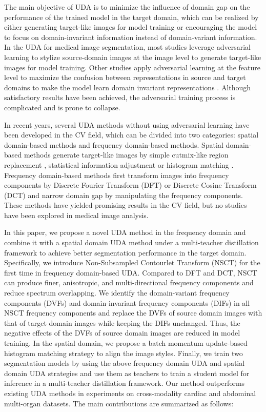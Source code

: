 \documentclass[letterpaper]{article} %
\begin{document}
The main objective of UDA is to minimize the influence of domain gap on the performance of the trained model in the target domain, 
which can be realized by either generating target-like images for model training or encouraging the model to focus on domain-invariant 
information instead of domain-variant information. In the UDA for medical image segmentation, most studies leverage adversarial learning 
to stylize source-domain images at the image level \cite{1,2,13,14,16,17,18,41} to generate target-like images for model training. Other studies 
apply adversarial learning at the feature level to maximize the confusion between representations in source and target domains to 
make the model learn domain invariant representations \cite{20,21}. Although satisfactory results have been achieved, the adversarial training 
process  is complicated and is prone to collapse.

In recent years, several UDA methods without using adversarial learning have been developed in the CV field, which can be 
divided into two categories: spatial domain-based methods and frequency domain-based methods. Spatial domain-based methods generate target-like images 
by simple cutmix-like region replacement \cite{22}, statistical information adjustment \cite{23,24} 
or histogram matching \cite{26}. Frequency domain-based methods first 
transform images into frequency components by Discrete Fourier Transform (DFT) \cite{19,26} or Discrete Cosine Transform (DCT) \cite{27} and narrow 
domain gap by manipulating the frequency components. These methods have yielded promising results in the CV field, 
but no studies have been explored in medical image analysis. 

In this paper, we propose a novel UDA method in the frequency domain and combine it with a spatial domain UDA method under a multi-teacher 
distillation framework to achieve better segmentation performance in the target domain. Specifically, we introduce Non-Subsampled Contourlet 
Transform (NSCT) for the first time in frequency domain-based UDA. Compared to DFT and DCT, NSCT can produce finer, anisotropic, and multi-directional 
frequency components and reduce spectrum overlapping. We identify the domain-variant frequency components (DVFs) and domain-invariant frequency components (DIFs) 
in all NSCT frequency components and replace the DVFs of source 
domain images with that of target domain images while keeping the DIFs unchanged. Thus, the negative effects of the DVFs of source domain images are 
reduced in model training. In the spatial domain, we propose a batch momentum update-based histogram matching strategy to align the image styles. 
Finally, we train two segmentation models by using the above frequency domain UDA and spatial domain UDA strategies and use them as teachers to train 
a student model for inference in a multi-teacher distillation framework. Our method 
outperforms existing UDA methods in experiments on cross-modality cardiac and abdominal multi-organ datasets. The main contributions are summarized as follows:
\end{document}
